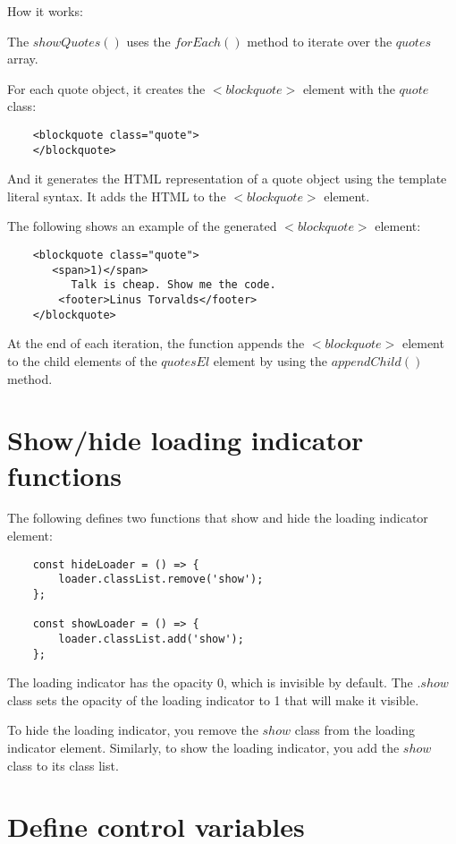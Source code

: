 \documentclass[11pt]{article}
\begin{document}
How it works:

The $showQuotes()$ uses the $forEach()$ method to iterate over
the $quotes$ array.

For each quote object, it creates the $<blockquote>$ element with
the $quote$ class:

\begin{lstlisting}
    <blockquote class="quote">
    </blockquote>
\end{lstlisting}

And it generates the HTML representation of a quote object using
the template literal syntax. It adds the HTML to the $<blockquote>$ element.

The following shows an example of the generated $<blockquote>$ element:

\begin{lstlisting}
    <blockquote class="quote">
       <span>1)</span>
          Talk is cheap. Show me the code.
        <footer>Linus Torvalds</footer>
    </blockquote>
\end{lstlisting}

At the end of each iteration, the function appends the $<blockquote>$
element to the child elements of the $quotesEl$ element by
using the $appendChild()$ method.

\section*{Show/hide loading indicator functions}

The following defines two functions that show and hide the loading indicator element:

\begin{lstlisting}
    const hideLoader = () => {
        loader.classList.remove('show');
    };

    const showLoader = () => {
        loader.classList.add('show');
    };
\end{lstlisting}

The loading indicator has the opacity 0, which is invisible by default.
The $.show$ class sets the opacity of the loading indicator to 1
that will make it visible.

To hide the loading indicator, you remove the $show$ class from the
loading indicator element. Similarly, to show the loading indicator,
you add the $show$ class to its class list.

\section*{Define control variables}
\end{document}
